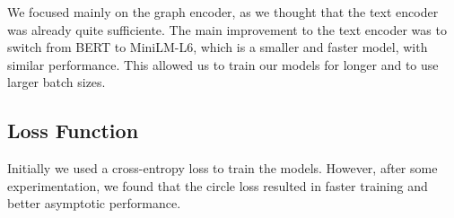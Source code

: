 \documentclass[switch, 11pt]{article}
\begin{document}
\begin{multicols}{2}
    \begin{table}[H]
        \begin{center}
        \end{center}
        \caption{Model evolution throughout the challenge.}
    \end{table}

    We focused mainly on the graph encoder, as we thought that the text encoder was already quite sufficiente. The main improvement to the text encoder was to switch from BERT to MiniLM-L6, which is a smaller and faster model, with similar performance. This allowed us to train our models for longer and to use larger batch sizes.

    \subsection{Loss Function}

    Initially we used a cross-entropy loss to train the models. However, after some experimentation, we found that the circle loss \cite{sun-2020} resulted in faster training and better asymptotic performance.


\end{multicols}
\end{document}
